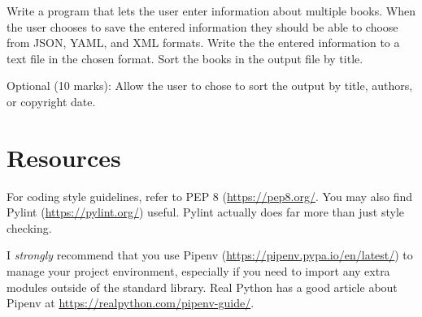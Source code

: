 \documentclass{article}
\begin{document}
Write a program that lets the user enter information about multiple books. When the user chooses to save the entered information they should be able to choose from JSON, YAML, and XML formats. Write the the entered information to a text file in the chosen format. Sort the books in the output file by title.

Optional (10 marks): Allow the user to chose to sort the output by title, authors, or copyright date.

\section*{Resources}
For coding style guidelines, refer to PEP 8 (\url{https://pep8.org/}. You may also find Pylint (\url{https://pylint.org/}) useful. Pylint actually 
does far more than just style checking.

I \emph{strongly} recommend that you use Pipenv (\url{https://pipenv.pypa.io/en/latest/}) to manage your project environment, especially if you need to import any extra modules outside of the standard library. Real Python has a good article about Pipenv at \url{https://realpython.com/pipenv-guide/}.

         
           
\end{document}

